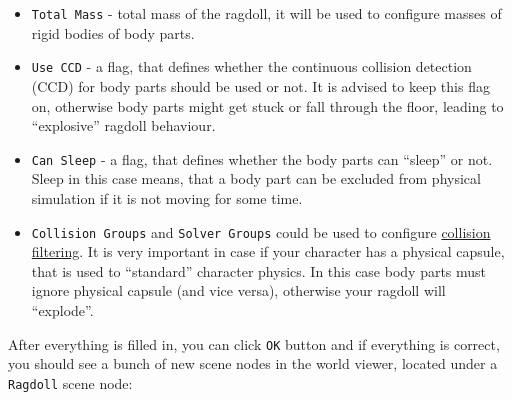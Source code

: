 \documentclass[
]{book}
\providecommand{\tightlist}{%
  \setlength{\itemsep}{0pt}\setlength{\parskip}{0pt}}
\theoremstyle{definition}
\theoremstyle{definition}
\theoremstyle{definition}
\theoremstyle{definition}
\theoremstyle{remark}
\begin{document}
\begin{itemize}
\tightlist
\item
  \texttt{Total\ Mass} - total mass of the ragdoll, it will be used to configure masses of rigid bodies of body parts.
\item
  \texttt{Use\ CCD} - a flag, that defines whether the continuous collision detection (CCD) for body parts should be used or not.
  It is advised to keep this flag on, otherwise body parts might get stuck or fall through the floor, leading to ``explosive'' ragdoll behaviour.
\item
  \texttt{Can\ Sleep} - a flag, that defines whether the body parts can ``sleep'' or not. Sleep in this case means, that a body part can be excluded from physical simulation if it is not moving for some time.
\item
  \texttt{Collision\ Groups} and \texttt{Solver\ Groups} could be used to configure \href{collider.md\#collision-filtering}{collision filtering}.
  It is very important in case if your character has a physical capsule, that is used to ``standard'' character physics. In this case body parts must ignore physical capsule (and vice versa), otherwise your ragdoll will ``explode''.
\end{itemize}

After everything is filled in, you can click \texttt{OK} button and if everything is correct, you should see a bunch of new scene nodes in the world viewer, located under a \texttt{Ragdoll} scene node:
\end{document}
